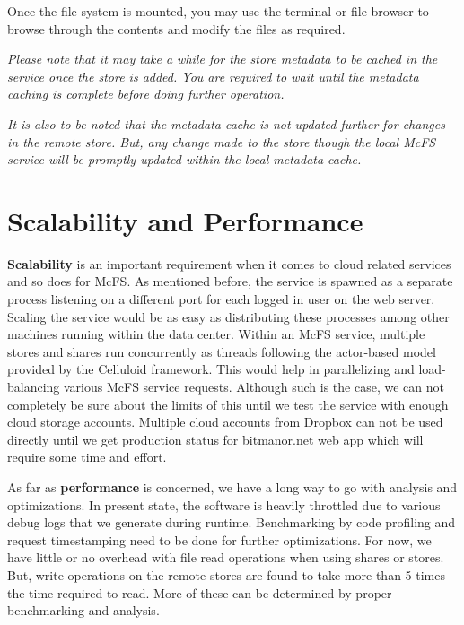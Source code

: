 Once the file system is mounted, you may use the terminal or file browser to browse through the contents and modify the files as required.

\emph{Please note that it may take a while for the store metadata to be cached in the service once the store is added. You are required to wait until the metadata caching is complete before doing further operation.}

\emph{It is also to be noted that the metadata cache is not updated further for changes in the remote store. But, any change made to the store though the local McFS service will be promptly updated within the local metadata cache.}


\section{Scalability and Performance}

\textbf{Scalability} is an important requirement when it comes to cloud related services and so does for McFS. As mentioned before, the service is spawned as a separate process listening on a different port for each logged in user on the web server. Scaling the service would be as easy as distributing these processes among other machines running within the data center. Within an McFS service, multiple stores and shares run concurrently as threads following the actor-based model provided by the Celluloid framework. This would help in parallelizing and load-balancing various McFS service requests. Although such is the case, we can not completely be sure about the limits of this until we test the service with enough cloud storage accounts. Multiple cloud accounts from Dropbox can not be used directly until we get production status for bitmanor.net web app which will require some time and effort.

As far as \textbf{performance} is concerned, we have a long way to go with analysis and optimizations. In present state, the software is heavily throttled due to various debug logs that we generate during runtime. Benchmarking by code profiling and request timestamping need to be done for further optimizations. For now, we have little or no overhead with file read operations when using shares or stores. But, write operations on the remote stores are found to take more than 5 times the time required to read. More of these can be determined by proper benchmarking and analysis.
